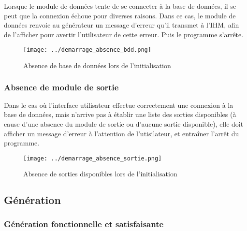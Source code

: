 Lorsque le module de données tente de se connecter à la base de données, il 
se peut que la connexion échoue pour diverses raisons. Dans ce cas, le 
module de données renvoie au générateur un message d'erreur qu'il transmet à
 l'IHM, afin de l'afficher pour avertir l'utilisateur de cette erreur. Puis 
 le programme s'arrête.
        
\begin{figure}[!h]
\texttt{[image: ../demarrage\_absence\_bdd.png]}
\caption{Absence de base de données lors de l'initialisation}
\end{figure}
        
\subsubsection{Absence de module de sortie}

Dans le cas où l'interface utilisateur effectue correctement une connexion à 
la base de données, mais n'arrive pas à établir une liste des sorties 
disponibles (à cause d'une absence du module de sortie ou d'aucune sortie 
disponible), elle doit afficher un message d'erreur à l'attention de 
l'utisilateur, et entraîner l'arrêt du programme.
        
\begin{figure}[!h]
\texttt{[image: ../demarrage\_absence\_sortie.png]}
\caption{Absence de sorties disponibles lors de l'initialisation}
\end{figure}
 
\subsection{Génération}

\subsubsection{Génération fonctionnelle et satisfaisante}

